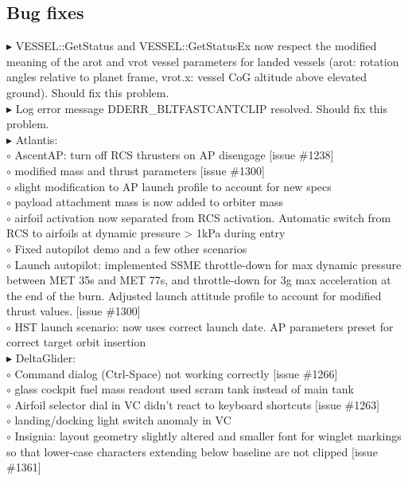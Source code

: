 \documentclass[Orbiter User Manual.tex]{subfiles}
\begin{document}
\subsection{Bug fixes}
$\blacktriangleright$ VESSEL::GetStatus and VESSEL::GetStatusEx now respect the modified meaning of the arot and vrot vessel parameters for landed vessels (arot: rotation angles relative to planet frame, vrot.x: vessel CoG altitude above elevated ground). Should fix this problem.\\
$\blacktriangleright$ Log error message DDERR\_BLTFASTCANTCLIP resolved. Should fix this problem.\\
$\blacktriangleright$ Atlantis:\\
$\circ$ AscentAP: turn off RCS thrusters on AP disengage [issue \#1238]\\
$\circ$ modified mass and thrust parameters [issue \#1300]\\
$\circ$ slight modification to AP launch profile to account for new specs\\
$\circ$ payload attachment mass is now added to orbiter mass\\
$\circ$ airfoil activation now separated from RCS activation. Automatic switch from RCS to airfoils at dynamic pressure > 1kPa during entry\\
$\circ$ Fixed autopilot demo and a few other scenarios\\
$\circ$ Launch autopilot: implemented SSME throttle-down for max dynamic pressure between MET 35s and MET 77s, and throttle-down for 3g max acceleration at the end of the burn. Adjusted launch attitude profile to account for modified thrust values. [issue \#1300]\\
$\circ$ HST launch scenario: now uses correct launch date. AP parameters preset for correct target orbit insertion\\
$\blacktriangleright$ DeltaGlider:\\
$\circ$ Command dialog (Ctrl-Space) not working correctly [issue \#1266]\\
$\circ$ glass cockpit fuel mass readout used scram tank instead of main tank\\
$\circ$ Airfoil selector dial in VC didn't react to keyboard shortcuts [issue \#1263]\\
$\circ$ landing/docking light switch anomaly in VC\\
$\circ$ Insignia: layout geometry slightly altered and smaller font for winglet markings so that lower-case characters extending below baseline are not clipped [issue \#1361]\\
\end{document}
